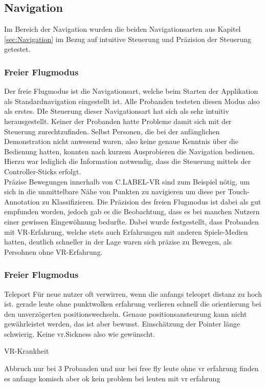 \subsection{Navigation}
Im Bereich der Navigation wurden die beiden Navigationsarten aus Kapitel \ref{sec:Navigation} im Bezug auf intuitive Steuerung und Präzision der Steuerung getestet.

\subsubsection{Freier Flugmodus}
Der freie Flugmodus ist die Navigationsart, welche beim Starten der Applikation als Standardnavigation eingestellt ist. Alle Probanden testeten diesen Modus also als erstes. DIe Steuerung dieser Navigationsart hat sich als sehr intuitiv herausgestellt. Keiner der Probanden hatte Probleme damit sich mit der Steuerung zurechtzufinden. Selbst Personen, die bei der anfänglichen Demonstration nicht anwesend waren, also keine genaue Kenntnis über die Bedienung hatten, konnten nach kurzem Ausprobieren die Navigation bedienen. Hierzu war lediglich die Information notwendig, dass die Steuerung mittels der Controller-Sticks erfolgt.\\

Präzise Bewegungen innerhalb von C.LABEL-VR sind zum Beispiel nötig, um sich in die unmittelbare Nähe von Punkten zu navigieren um diese per Touch-Annotation zu Klassifizieren. Die Präzision des freien Flugmodus ist dabei als gut empfunden worden, jedoch gab es die Beobachtung, dass es bei manchen Nutzern einer gewissen Eingewöhnung bedurfte. Dabei wurde festgestellt, dass Probanden mit VR-Erfahrung, welche stets auch Erfahrungen mit anderen Spiele-Medien hatten, deutlich schneller in der Lage waren sich präzise zu Bewegen, als Persohnen ohne VR-Erfahrung.

\subsubsection{Freier Flugmodus}
Teleport Für neue nutzer oft verwirren, wenn die anfangs teleoprt distanz zu hoch ist. gerade leute ohne punktwolken erfahrung verlieren schnell die orientierung bei den unverzögerten positionswechseln. Genaue positionsansteurung kann nicht gewährleistet werden, das ist aber bewusst. Einschätzung der Pointer länge schwierig. Keine vr.Sickness also wie gewünscht.



VR-Krankheit

Abbruch nur bei 3 Probanden und nur bei free fly
leute ohne vr erfahrung finden es anfangs komisch aber ok
kein problem bei leuten mit vr erfahrung




